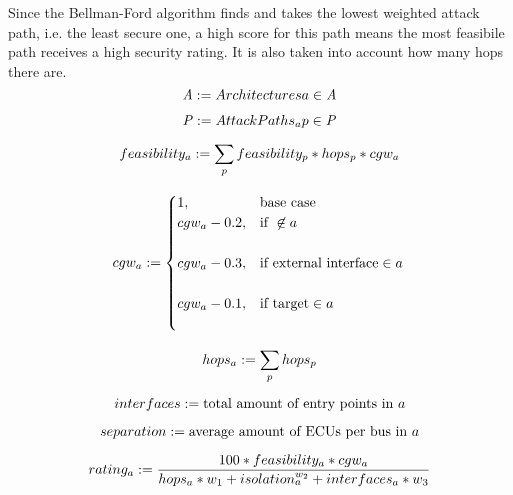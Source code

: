 Since the Bellman-Ford algorithm finds and takes the lowest weighted attack path, i.e. the least secure one, 
a high score for this path means the most feasibile path receives a high security rating.
It is also taken into account how many hops there are. \\

\begin{equation}
    \mathit{A} := {Architectures} a \in \mathit{A} \label{eq:architectures}\\\\
\end{equation}

\begin{equation}
    \mathit{P} := {Attack Paths_{a}} p \in \mathit{P} \label{eq:attack_paths}\\\\
\end{equation}

\begin{equation}
    feasibility_{a} := \sum_{p} feasibility_{p} * hops_{p} * cgw_{a} \label{eq:feasibility}\\\\
\end{equation}

\begin{equation}
    cgw_{a} := 
    \begin{cases}
    1,&\text{base case}\\
    cgw_{a} - 0.2,&\text{if } \not\in a\\\\
    cgw_{a} - 0.3,&\text{if external interface} \in a\\\\
    cgw_{a} - 0.1,&\text{if target} \in a\\\\
    \end{cases} \label{eq:cgw}\\\\
\end{equation}

\begin{equation}
    hops_{a} := \sum_{p} hops_{p} \label{eq:hops}\\\\
\end{equation}

\begin{equation}
    interfaces := \text{total amount of entry points in } a \label{eq:interfaces}\\\\
\end{equation}

\begin{equation}
    separation := \text{average amount of ECUs per bus in } a \label{eq:separation}\\\\
\end{equation}

\begin{equation}
    rating_{a} := \frac{100 * feasibility_{a} * cgw_{a}}{hops_{a}*w_{1} + isolation_{a}^{w_{2}} + interfaces_{a}*w_{3}} \label{eq:rating}\\\\
\end{equation}